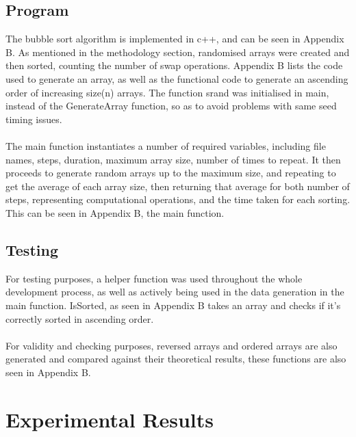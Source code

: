 \documentclass[]{article}
\begin{document}
\subsection{Program}
The bubble sort algorithm is implemented in c++, and can be seen in Appendix B. As mentioned in the methodology section, randomised arrays were created and then sorted, counting the number of swap operations. Appendix B lists the code used to generate an array, as well as the functional code to generate an ascending order of increasing size(n) arrays. The function srand was initialised in main, instead of the GenerateArray function, so as to avoid problems with same seed timing issues.
\\\\
The main function instantiates a number of required variables, including file names, steps, duration, maximum array size, number of times to repeat. It then proceeds to generate random arrays up to the maximum size, and repeating to get the average of each array size, then returning that average for both number of steps, representing computational operations, and the time taken for each sorting. This can be seen in Appendix B, the main function.

\subsection{Testing}
For testing purposes, a helper function was used throughout the whole development process, as well as actively being used in the data generation in the main function. IsSorted, as seen in Appendix B takes an array and checks if it's correctly sorted in ascending order. 
\\\\
For validity and checking purposes, reversed arrays and ordered arrays are also generated and compared against their theoretical results, these functions are also seen in Appendix B.
\section{Experimental Results}
\end{document}
